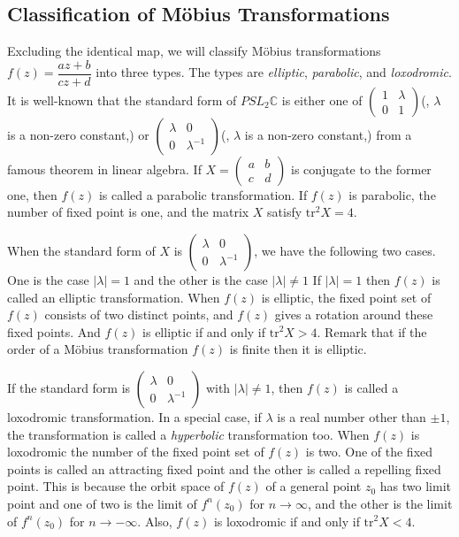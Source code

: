 \subsection{Classification of M\"obius Transformations}

Excluding the identical map, we will classify M\"obius transformations
$f(z) = \dfrac{az + b}{cz + d}$ into three types.
The types are \textit{elliptic}, \textit{parabolic}, and \textit{loxodromic}.
It is well-known that the standard form of $PSL_2\mathbb{C}$
is either one of $\begin{pmatrix}1 & \lambda \\ 0 & 1 \end{pmatrix}$(, $\lambda$ is a non-zero constant,) or
$\begin{pmatrix}\lambda & 0 \\ 0 & \lambda^{-1} \end{pmatrix}$(, $\lambda$ is a non-zero constant,) 
from a famous theorem in linear algebra.
If $X=\begin{pmatrix}a & b \\ c & d \end{pmatrix}$ is conjugate to the former one,
then $f(z)$ is called a parabolic transformation.
If $f(z)$ is parabolic, the number of fixed point is one, and
the matrix $X$ satisfy $\mathrm{tr}^2X = 4$.

When the standard form of $X$ is
$\begin{pmatrix}\lambda & 0 \\ 0 & \lambda^{-1} \end{pmatrix}$,
we have the following two cases. 
One is the case $|\lambda|=1$ and the other is the case $|\lambda|\neq 1$ 
If $|\lambda|=1$ then $f(z)$ is called an elliptic transformation.
When $f(z)$ is elliptic,  the fixed point set of $f(z)$ consists of two distinct points,
and $f(z)$ gives a rotation around these fixed points.
And $f(z)$ is elliptic if and only if $\mathrm{tr}^2X > 4$.
Remark that if the order of a M\"obius transformation $f(z)$ is finite
then it is elliptic.

If the standard form is
$\begin{pmatrix}\lambda & 0 \\ 0 & \lambda^{-1} \end{pmatrix}$
with $|\lambda| \neq 1$, then $f(z)$ is called a loxodromic transformation.
In a special case, if $\lambda$ is a real number other than $\pm 1$, the transformation is called
a \textit{hyperbolic} transformation too.
When $f(z)$ is loxodromic the number of the fixed point set of $f(z)$ is two.
One of the fixed points is called an attracting fixed point and the other is called a 
repelling fixed point. This is because the orbit space of $f(z)$ of a
general point $z_0$ has two limit point and one of two is the limit of
$f^n(z_0)$ for $n\to \infty$, and the other is the limit of $f^n(z_0)$
for $n\to -\infty$. 
Also, $f(z)$ is loxodromic if and only if $\mathrm{tr}^2X < 4$.

